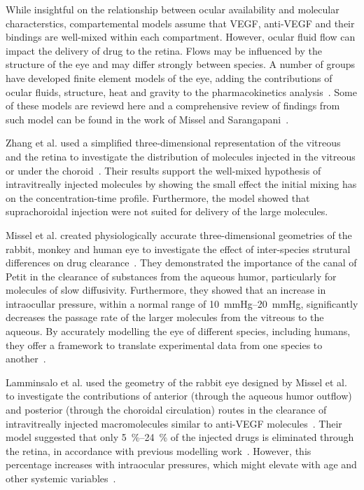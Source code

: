 \documentclass[11pt,a4paper, twocolumn]{article}
\begin{document}
While insightful on the relationship between ocular availability and molecular characterstics, compartemental models assume that VEGF, anti-VEGF and their bindings are well-mixed within each compartment.
However, ocular fluid flow can impact the delivery of drug to the retina.
Flows may be influenced by the structure of the eye and may differ strongly between species.
A number of groups have developed finite element models of the eye, adding the contributions of ocular fluids, structure, heat and gravity to the pharmacokinetics analysis~\cite{Lamminsalo_2018, Missel_2012, Zhang_2018}.
Some of these models are reviewd here and a comprehensive review of findings from such model can be found in the work of Missel and Sarangapani~\cite{Missel_2019}.

Zhang et al. used a simplified three-dimensional representation of the vitreous and the retina to investigate the distribution of molecules injected in the vitreous or under the choroid~\cite{Zhang_2018}.
Their results support the well-mixed hypothesis of intravitreally injected molecules by showing the small effect the initial mixing has on the concentration-time profile.
Furthermore, the model showed that suprachoroidal injection were not suited for delivery of the large molecules.

Missel et al. created physiologically accurate three-dimensional geometries of the rabbit, monkey and human eye to investigate the effect of inter-species strutural differences on drug clearance~\cite{Missel_2012}.  
They demonstrated the importance of the canal of Petit in the clearance of substances from the aqueous humor, particularly for molecules of slow diffusivity. 
Furthermore, they showed that an increase in intraocullar pressure, within a normal range of \SIrange{10}{20}{\mmHg}, significantly decreases the passage rate of the larger molecules from the vitreous to the aqueous.
By accurately modelling the eye of different species, including humans, they offer a framework to translate experimental data from one species to another~\cite{Missel_2012}.

Lamminsalo et al. used the geometry of the rabbit eye designed by Missel et al. to investigate the contributions of anterior (through the aqueous humor outflow) and posterior (through the choroidal circulation) routes in the clearance of intravitreally injected macromolecules similar to anti-VEGF molecules~\cite{Lamminsalo_2018}.
Their model suggested that only \SIrange{5}{24}{\percent} of the injected drugs is eliminated through the retina, in accordance with previous modelling work~\cite{hutton-smith_ocular_2017}.
However, this percentage increases with intraocular pressures, which might elevate with age and other systemic variables~\cite{Armaly1967,Hashemi2005}.
\end{document}
